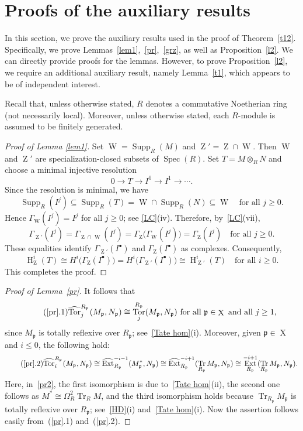 \documentclass[11pt]{amsart}
\theoremstyle{definition}
\theoremstyle{definition}
\numberwithin{equation}{section}
\newcommand{\fp}{\mathfrak{p}}
\DeclareMathOperator{\Tr}{Tr}
\DeclareMathOperator{\X}{X}
\DeclareMathOperator{\mz}{Z}
\DeclareMathOperator{\mw}{W}
\DeclareMathOperator{\Ext}{Ext}
\DeclareMathOperator{\hh}{H}
\DeclareMathOperator{\Supp}{Supp}
\DeclareMathOperator{\Spec}{Spec}
\DeclareMathOperator{\Tor}{Tor}
\begin{document}
\section{Proofs of the auxiliary results}\label{PAR}
In this section, we prove the auxiliary results used in the proof of Theorem~\ref{t12}. Specifically, we prove Lemmas~\ref{lem1},~\ref{pr},~\ref{grz}, as well as Proposition~\ref{l2}. We can directly provide proofs for the lemmas. However, to prove Proposition~\ref{l2}, we require an additional auxiliary result, namely Lemma~\ref{t1}, which appears to be of independent interest.

Recall that, unless otherwise stated, $R$ denotes a commutative Noetherian ring (not necessarily local). Moreover, unless otherwise stated, each $R$-module is assumed to be finitely generated. 

\begin{proof}[Proof of Lemma \ref{lem1}] 
Set $\mw=\Supp_R(M)$ and $\mz'=\mz\cap\mw$.
Then $\mw$ and $\mz'$ are specialization-closed subsets
of $\Spec(R)$. Set $T=M\otimes_RN$ and choose a minimal injective resolution
\[
0\longrightarrow T\longrightarrow I^0\longrightarrow I^1
\longrightarrow\cdots.
\]
Since the resolution is minimal, we have
\[
\Supp_R(I^j)\subseteq\Supp_R(T)
=\mw\cap\Supp_R(N)\subseteq\mw
\quad\text{for all }j\geq0.
\]
Hence $\Gamma_{\mw}(I^j)=I^j$ for all $j\geq0$;
see \ref{LC}(iv). Therefore, by~\ref{LC}(vii),
\[
\Gamma_{\mz'}(I^j)
=\Gamma_{\mz\cap\mw}(I^j)
=\Gamma_{\mz}\bigl(\Gamma_{\mw}(I^j)\bigr)
=\Gamma_{\mz}(I^j)
\quad\text{for all }j\geq0.
\]
These equalities identify
$\Gamma_{\mz'}(I^\bullet)$ and $\Gamma_{\mz}(I^\bullet)$
as complexes. Consequently,
\[
\hh^i_{\mz}(T)
\cong H^i\bigl(\Gamma_{\mz}(I^\bullet)\bigr)
=H^i\bigl(\Gamma_{\mz'}(I^\bullet)\bigr)
\cong\hh^i_{\mz'}(T)
\quad\text{for all }i\geq0.
\]
This completes the proof.
\end{proof}

\begin{proof}[Proof of Lemma~\ref{pr}] It follows that
\begin{equation}\label{pr1} \tag{\ref*{pr}.1}
\widehat{\Tor}_j^{R_\fp}(M_\fp,N_\fp)\cong\Tor_{j}^{R_\fp}(M_\fp,N_\fp) \text{ for all } \fp\in\X \text{ and all } j\geq 1,
\end{equation}
since $M_{\fp}$ is totally reflexive over $R_{\fp}$; see~\ref{Tate hom}(i). Moreover, given $\fp\in\X$ and $i\leq 0$, the following hold:
\begin{equation}\label{pr2} \tag{\ref*{pr}.2}
\widehat{\Tor}_i^{R_\fp}(M_\fp,N_\fp)\cong\widehat{\Ext}^{-i-1}_{R_\fp}(M^*_\fp,N_\fp)\cong\widehat{\Ext}^{-i+1}_{R_\fp}(\Tr_{R_\fp} M_\fp,N_\fp)\cong\Ext^{-i+1}_{R_\fp}(\Tr_{R_\fp} M_\fp,N_\fp).
\end{equation}
Here, in~\eqref{pr2}, the first isomorphism is due to~\ref{Tate hom}(ii), the second one follows as $M^{\ast} \cong \Omega_R^2\Tr_R M$, and the third isomorphism holds because $\Tr_{R_\fp} M_\fp$ is totally reflexive over $R_{\fp}$; see~\ref{HD}(i) and~\ref{Tate hom}(i). Now the assertion follows easily from~(\ref{pr}.1) and~(\ref{pr}.2).
\end{proof}
\end{document}
